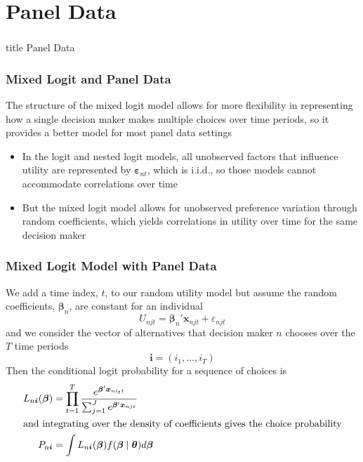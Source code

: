\documentclass{beamer}
\begin{document}
\section{Panel Data}
\label{panel}
\begin{frame}\frametitle{}
    \vfill
    \centering
    \begin{beamercolorbox}[center]{title}
        \Large Panel Data
    \end{beamercolorbox}
    \vfill
\end{frame}

\begin{frame}\frametitle{Mixed Logit and Panel Data}
    The structure of the mixed logit model allows for more flexibility in representing how a single decision maker makes multiple choices over time periods, so it provides a better model for most panel data settings
    \begin{itemize}
        \item In the logit and nested logit models, all unobserved factors that influence utility are represented by $\bm{\varepsilon}_{nt}$, which is i.i.d., so those models cannot accommodate correlations over time
        \item But the mixed logit model allows for unobserved preference variation through random coefficients, which yields correlations in utility over time for the same decision maker
    \end{itemize}
\end{frame}

\begin{frame}\frametitle{Mixed Logit Model with Panel Data}
    We add a time index, $t$, to our random utility model but assume the random coefficients, $\bm{\beta}_n$, are constant for an individual
    $$U_{njt} = \bm{\beta}_n' \bm{x}_{njt} + \varepsilon_{njt}$$
    and we consider the vector of alternatives that decision maker $n$ chooses over the $T$ time periods
    $$\bm{i} = (i_1, \ldots, i_T)$$
    Then the conditional logit probability for a sequence of choices is
    \begin{align*}
        L_{n\bm{i}}(\bm{\beta}) & = \prod_{t = 1}^T \frac{e^{\bm{\beta}' \bm{x}_{ni_{t}t}}}{\sum_{j = 1}^J e^{\bm{\beta}' \bm{x}_{njt}}} \\
        \intertext{and integrating over the density of coefficients gives the choice probability}
        P_{n\bm{i}} & = \int L_{n\bm{i}}(\bm{\beta}) f(\bm{\beta} \mid \bm{\theta}) d \bm{\beta}
    \end{align*}
\end{frame}
\end{document}
